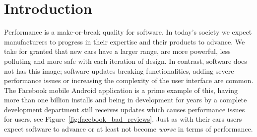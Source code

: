 \chapter{Introduction}
\label{chp:introduction}





% 

Performance is a make-or-break quality for software.
In today's society we expect manufacturers to progress in their expertise and their products to advance.
We take for granted that new cars have a larger range, are more powerful, less polluting and more safe with each iteration of design.
In contrast, software does not has this image; software updates breaking functionalities, adding severe performance issues or increasing the complexity of the user interface are common.
The Facebook mobile Android application is a prime example of this, having more than one billion installs and being in development for years by a complete development department still receives updates which causes performance issues for users, see Figure~\ref{fig:facebook_bad_reviews}.
Just as with their cars users expect software to advance or at least not become \emph{worse} in terms of performance. 

